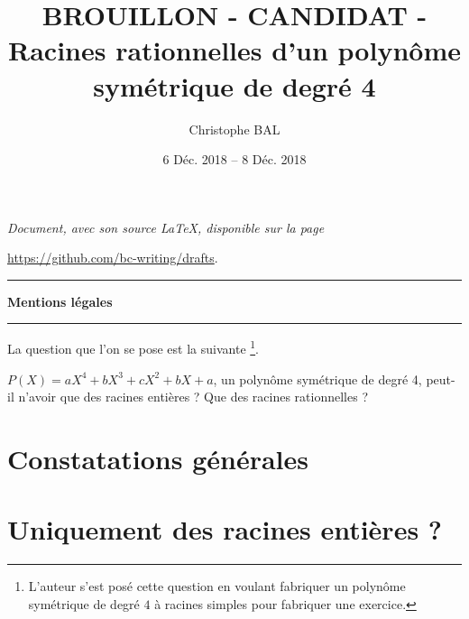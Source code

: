 \documentclass[12pt]{amsart}
\begin{document}
\title{BROUILLON - CANDIDAT - Racines rationnelles d'un polynôme symétrique de degré 4}
\author{Christophe BAL}
\date{6 Déc. 2018 -- 8 Déc. 2018}
\maketitle



\begin{center}
	\itshape
	Document, avec son source \LaTeX, disponible sur la page
	
	\url{https://github.com/bc-writing/drafts}.
\end{center}


\bigskip


\begin{center}
	\hrule\vspace{.3em}
	{
		\fontsize{1.35em}{1em}\selectfont
		\textbf{Mentions \og légales \fg}
	}
			
	\vspace{0.45em}
	\doclicenseThis
	\hrule
\end{center}


\bigskip

La question que l'on se pose est la suivante
\footnote{
	L'auteur s'est posé cette question en voulant fabriquer un polynôme symétrique de degré $4$ à racines \og simples \fg{} pour fabriquer une exercice.
}.

\medskip

\begin{tcolorbox}
	$P(X) = a X^4 + b X^3 + c X^2 + b X + a$, un polynôme symétrique de degré 4, peut-il n'avoir que des racines entières ? Que des racines rationnelles ?
\end{tcolorbox}


\medskip
\setcounter{tocdepth}{1}
\tableofcontents



\section{Constatations générales}





\section{Uniquement des racines entières ?}


\end{document}
